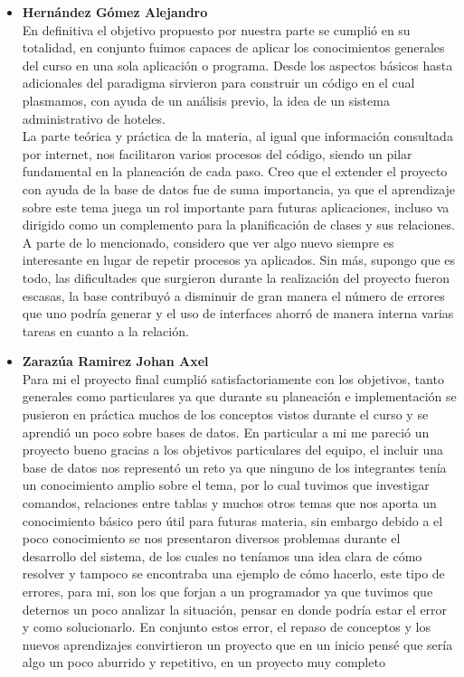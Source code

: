 \documentclass[a4paper,12pt]{article}
\begin{document}
\begin{flushleft}
\begin{itemize}
\item{\textbf{Hernández Gómez Alejandro}}
\vspace{0.3cm}
\textsf{\\En definitiva el objetivo propuesto por nuestra parte se cumplió en su totalidad, en conjunto fuimos capaces de aplicar los conocimientos generales del curso en una sola aplicación o programa. Desde los aspectos básicos hasta adicionales del paradigma sirvieron para construir un código en el cual plasmamos, con ayuda de un análisis previo, la idea de un sistema administrativo de hoteles.\vspace{0.3cm}\\La parte teórica y práctica de la materia, al igual que información consultada por internet, nos facilitaron varios procesos del código, siendo un pilar fundamental en la planeación de cada paso. Creo que el extender el proyecto con ayuda de la base de datos fue de suma importancia, ya que el aprendizaje sobre este tema juega un rol importante para futuras aplicaciones, incluso va dirigido como un complemento para la planificación de clases y sus relaciones.\vspace{0.3cm}\\A parte de lo mencionado, considero que ver algo nuevo siempre es interesante en lugar de repetir procesos ya aplicados. Sin más, supongo que es todo, las dificultades que surgieron durante la realización del proyecto fueron escasas, la base contribuyó a disminuir de gran manera el número de errores que uno podría generar y el uso de interfaces ahorró de manera interna varias tareas en cuanto a la relación.}

\item{\textbf{Zarazúa Ramirez Johan Axel}}
\vspace{0.3cm}
\textsf{\\Para mi el proyecto final cumplió satisfactoriamente con los objetivos, tanto generales como particulares ya que durante su planeación e implementación se pusieron en práctica muchos de los conceptos vistos durante el curso y se aprendió un poco sobre bases de datos. En particular a mi me pareció un proyecto bueno gracias a los objetivos particulares del equipo, el incluir una base de datos nos representó un reto ya que ninguno de los integrantes tenía un conocimiento amplio sobre el tema, por lo cual tuvimos que investigar comandos, relaciones entre tablas y muchos otros temas que nos aporta un conocimiento básico pero útil para futuras materia, sin embargo debido a el poco conocimiento se nos presentaron diversos problemas durante el desarrollo del sistema, de los cuales no teníamos una idea clara de cómo resolver y tampoco se encontraba una ejemplo de cómo hacerlo, este tipo de errores, para mi, son los que forjan a un programador ya que tuvimos que deternos un poco analizar la situación, pensar en donde podría estar el error y como solucionarlo. En conjunto estos error, el repaso de conceptos y los nuevos aprendizajes convirtieron un proyecto que en un inicio pensé que sería algo un poco aburrido y repetitivo, en un proyecto muy completo}

\end{itemize}
\end{flushleft}
\end{document}
